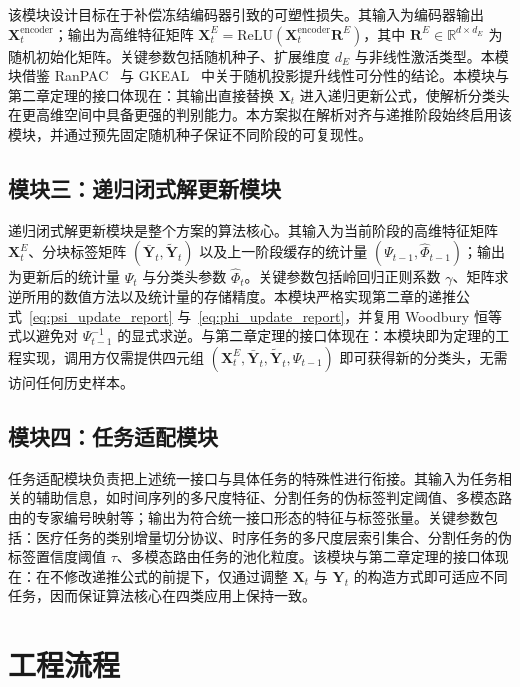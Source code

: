 该模块设计目标在于补偿冻结编码器引致的可塑性损失。其输入为编码器输出 $\mathbf{X}_t^{\mathrm{encoder}}$；输出为高维特征矩阵 $\mathbf{X}_t^{E}=\mathrm{ReLU}(\mathbf{X}_t^{\mathrm{encoder}}\mathbf{R}^E)$，其中 $\mathbf{R}^E\in\mathbb{R}^{d\times d_E}$ 为随机初始化矩阵。关键参数包括随机种子、扩展维度 $d_E$ 与非线性激活类型。本模块借鉴 RanPAC~\citep{mcdonnell2023ranpac} 与 GKEAL~\citep{GKEAL_Zhuang_CVPR2023} 中关于随机投影提升线性可分性的结论。本模块与第二章定理的接口体现在：其输出直接替换 $\mathbf{X}_t$ 进入递归更新公式，使解析分类头在更高维空间中具备更强的判别能力。本方案拟在解析对齐与递推阶段始终启用该模块，并通过预先固定随机种子保证不同阶段的可复现性。

\subsection{模块三：递归闭式解更新模块}

递归闭式解更新模块是整个方案的算法核心。其输入为当前阶段的高维特征矩阵 $\mathbf{X}_t^{E}$、分块标签矩阵 $(\bar{\mathbf{Y}}_t,\tilde{\mathbf{Y}}_t)$ 以及上一阶段缓存的统计量 $(\Psi_{t-1},\widehat{\Phi}_{t-1})$；输出为更新后的统计量 $\Psi_t$ 与分类头参数 $\widehat{\Phi}_t$。关键参数包括岭回归正则系数 $\gamma$、矩阵求逆所用的数值方法以及统计量的存储精度。本模块严格实现第二章的递推公式~\eqref{eq:psi_update_report} 与~\eqref{eq:phi_update_report}，并复用 Woodbury 恒等式以避免对 $\Psi_{t-1}^{-1}$ 的显式求逆。与第二章定理的接口体现在：本模块即为定理的工程实现，调用方仅需提供四元组 $(\mathbf{X}_t^{E},\bar{\mathbf{Y}}_t,\tilde{\mathbf{Y}}_t,\Psi_{t-1})$ 即可获得新的分类头，无需访问任何历史样本。

\subsection{模块四：任务适配模块}

任务适配模块负责把上述统一接口与具体任务的特殊性进行衔接。其输入为任务相关的辅助信息，如时间序列的多尺度特征、分割任务的伪标签判定阈值、多模态路由的专家编号映射等；输出为符合统一接口形态的特征与标签张量。关键参数包括：医疗任务的类别增量切分协议、时序任务的多尺度层索引集合、分割任务的伪标签置信度阈值 $\tau$、多模态路由任务的池化粒度。该模块与第二章定理的接口体现在：在不修改递推公式的前提下，仅通过调整 $\mathbf{X}_t$ 与 $\mathbf{Y}_t$ 的构造方式即可适应不同任务，因而保证算法核心在四类应用上保持一致。

\section{工程流程}

